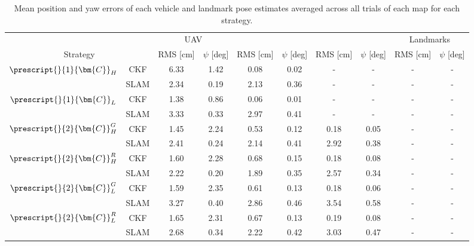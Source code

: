 \begin{table*}
	\centering
	\caption{Mean position and yaw errors of each vehicle and landmark pose estimates averaged across all trials of each map for each strategy.}
	\label{tab:avg_errors}
	\renewcommand{\arraystretch}{1.25}
	\begin{tabular}{c c | c c | c c | c c | c c}
		\toprule
		\toprule
		& &\multicolumn{2}{c|}{UAV}& \multicolumn{2}{c|}{\textsub{UGV}{1}} & \multicolumn{2}{c|}{\textsub{UGV}{2}} & \multicolumn{2}{c}{Landmarks} \\ 
		\multicolumn{2}{c|}{Strategy} & RMS [cm] & $\psi$ [deg] & RMS [cm] & $\psi$ [deg] & RMS [cm] & $\psi$ [deg] & RMS [cm] & $\psi$ [deg] \\ 
		\midrule
			\multirow{2}{*}{$\prescript{}{1}{\bm{C}}_{H}^{}$}
				& CKF  &   6.33 &   1.42&   0.08 &   0.02 & - & - & - & -\\
				& SLAM &   2.34 &   0.19&   2.13 &   0.36 & - & - & - & -\\
		\midrule
			\multirow{2}{*}{$\prescript{}{1}{\bm{C}}_{L}^{}$}
				& CKF  &   1.38 &   0.86&   0.06 &   0.01 & - & - & - & -\\
				& SLAM &   3.33 &   0.33&   2.97 &   0.41 & - & - & - & -\\
		\midrule
			\multirow{2}{*}{$\prescript{}{2}{\bm{C}}_{H}^{G}$}
				& CKF  &   1.45 &   2.24&   0.53 &   0.12 &   0.18 &   0.05 & - & -\\
				& SLAM &   2.41 &   0.24&   2.14 &   0.41 &   2.92 &   0.38 & - & -\\
		\midrule
			\multirow{2}{*}{$\prescript{}{2}{\bm{C}}_{H}^{R}$}
				& CKF  &   1.60 &   2.28&   0.68 &   0.15 &   0.18 &   0.08 & - & -\\
				& SLAM &   2.22 &   0.20&   1.89 &   0.35 &   2.57 &   0.34 & - & -\\
		\midrule
			\multirow{2}{*}{$\prescript{}{2}{\bm{C}}_{L}^{G}$}
				& CKF  &   1.59 &   2.35&   0.61 &   0.13 &   0.18 &   0.06 & - & -\\
				& SLAM &   3.27 &   0.40&   2.86 &   0.46 &   3.54 &   0.58 & - & -\\
		\midrule
			\multirow{2}{*}{$\prescript{}{2}{\bm{C}}_{L}^{R}$}
				& CKF  &   1.65 &   2.31&   0.67 &   0.13 &   0.19 &   0.08 & - & -\\
				& SLAM &   2.68 &   0.34&   2.22 &   0.42 &   3.03 &   0.47 & - & -\\
		\toprule
		\toprule
	\end{tabular}
	\renewcommand{\arraystretch}{1}
\end{table*}
